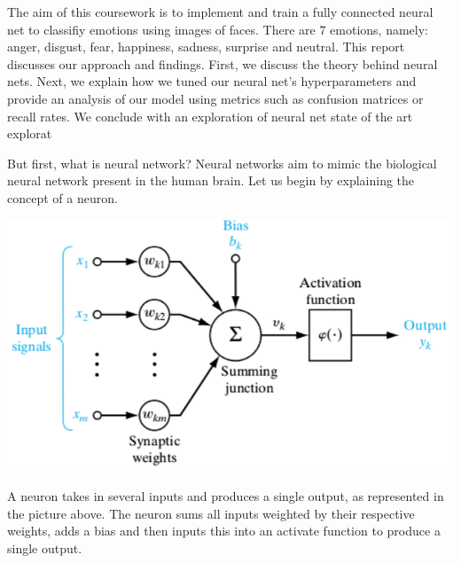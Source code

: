 The aim of this coursework is to implement and train a fully connected neural net to classifiy emotions using images of faces.
There are 7 emotions, namely: anger, disgust, fear, happiness, sadness, surprise and neutral.
This report discusses our approach and findings.
First, we discuss the theory behind neural nets.
Next, we explain how we tuned our neural net's hyperparameters
and provide an analysis of our model using metrics such as confusion matrices or recall rates.
We conclude with an exploration of neural net state of the art explorat

But first, what is neural network?
Neural networks aim to mimic the biological neural network present in the human brain.
Let us begin by explaining the concept of a neuron.

\begin{center}
\includegraphics[scale = 0.35]{src/diagrams/neuron_diagram.png}
\end{center}

A neuron takes in several inputs and produces a single output, as represented in the picture above.
The neuron sums all inputs weighted by their respective weights,
adds a bias and then inputs this into an activate function to produce a single output.


